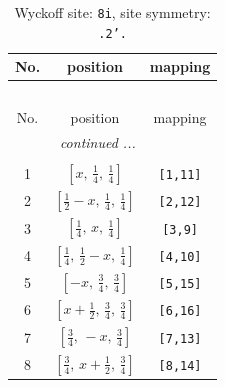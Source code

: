 \documentclass[fleqn,8pt]{jsarticle}
\begin{document}
\begin{longtable}{ccc}
\caption{Wyckoff site: {\tt 8i}, site symmetry: {\tt .2'.}}
 \\
 \hline \hline
No. & position & mapping \\ \hline \endfirsthead

\multicolumn{2}{l}{\tablename\ \thetable{}} \\
 \hline \hline
No. & position & mapping \\ \hline \endhead

 \hline \hline
\multicolumn{2}{r}{\footnotesize\it continued ...} \\ \endfoot

 \hline \hline
\multicolumn{2}{r}{} \\ \endlastfoot

1 & $\left[ x,\, \frac{1}{4},\, \frac{1}{4} \right]$ & {\tt [1,11]} \\ \hline
2 & $\left[ \frac{1}{2} - x,\, \frac{1}{4},\, \frac{1}{4} \right]$ & {\tt [2,12]} \\ \hline
3 & $\left[ \frac{1}{4},\, x,\, \frac{1}{4} \right]$ & {\tt [3,9]} \\ \hline
4 & $\left[ \frac{1}{4},\, \frac{1}{2} - x,\, \frac{1}{4} \right]$ & {\tt [4,10]} \\ \hline
5 & $\left[ - x,\, \frac{3}{4},\, \frac{3}{4} \right]$ & {\tt [5,15]} \\ \hline
6 & $\left[ x + \frac{1}{2},\, \frac{3}{4},\, \frac{3}{4} \right]$ & {\tt [6,16]} \\ \hline
7 & $\left[ \frac{3}{4},\, - x,\, \frac{3}{4} \right]$ & {\tt [7,13]} \\ \hline
8 & $\left[ \frac{3}{4},\, x + \frac{1}{2},\, \frac{3}{4} \right]$ & {\tt [8,14]} \\
\end{longtable}
\renewcommand{\arraystretch}{1.2}
\end{document}
